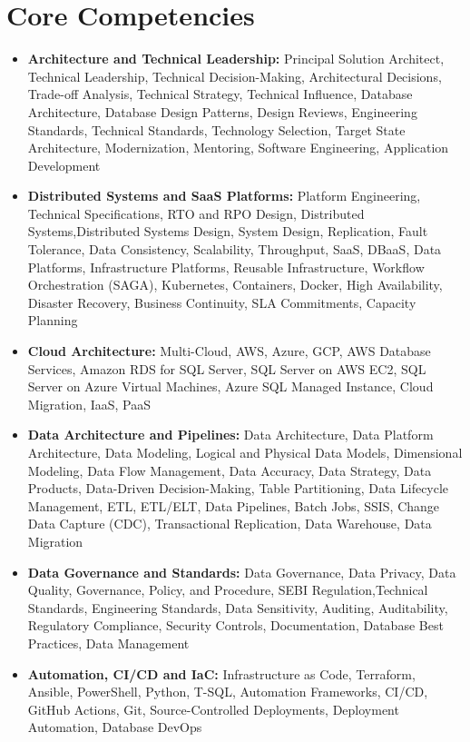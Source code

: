 \documentclass[10pt,a4paper]{article}
\begin{document}
\section{Core Competencies}
\begin{itemize}
  \item \textbf{Architecture and Technical Leadership:} Principal Solution Architect, Technical Leadership, Technical Decision-Making, Architectural Decisions, Trade-off Analysis, Technical Strategy, Technical Influence, Database Architecture, Database Design Patterns, Design Reviews, Engineering Standards, Technical Standards, Technology Selection, Target State Architecture, Modernization, Mentoring, Software Engineering, Application Development
  \item \textbf{Distributed Systems and SaaS Platforms:} Platform Engineering, Technical Specifications, RTO and RPO Design, Distributed Systems,Distributed Systems Design, System Design, Replication, Fault Tolerance, Data Consistency, Scalability, Throughput, SaaS, DBaaS, Data Platforms, Infrastructure Platforms, Reusable Infrastructure, Workflow Orchestration (SAGA), Kubernetes, Containers, Docker, High Availability, Disaster Recovery, Business Continuity, SLA Commitments, Capacity Planning
  \item \textbf{Cloud Architecture:} Multi-Cloud, AWS, Azure, GCP, AWS Database Services, Amazon RDS for SQL Server, SQL Server on AWS EC2, SQL Server on Azure Virtual Machines, Azure SQL Managed Instance, Cloud Migration, IaaS, PaaS
  \item \textbf{Data Architecture and Pipelines:} Data Architecture, Data Platform Architecture, Data Modeling, Logical and Physical Data Models, Dimensional Modeling, Data Flow Management, Data Accuracy, Data Strategy, Data Products, Data-Driven Decision-Making, Table Partitioning, Data Lifecycle Management, ETL, ETL/ELT, Data Pipelines, Batch Jobs, SSIS, Change Data Capture (CDC), Transactional Replication, Data Warehouse, Data Migration
  \item \textbf{Data Governance and Standards:} Data Governance, Data Privacy, Data Quality, Governance, Policy, and Procedure, SEBI Regulation,Technical Standards, Engineering Standards, Data Sensitivity, Auditing, Auditability, Regulatory Compliance, Security Controls, Documentation, Database Best Practices, Data Management
  \item \textbf{Automation, CI/CD and IaC:} Infrastructure as Code, Terraform, Ansible, PowerShell, Python, T-SQL, Automation Frameworks, CI/CD, GitHub Actions, Git, Source-Controlled Deployments, Deployment Automation, Database DevOps

\end{itemize}
\end{document}
